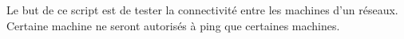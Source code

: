 \documentclass[../file_doc_script.tex]{subfiles}
\begin{document}
Le but de ce script est de tester la connectivité entre les machines d'un réseaux.
Certaine machine ne seront autorisés à ping que certaines machines.

\UseRawInputEncoding

\end{document}
